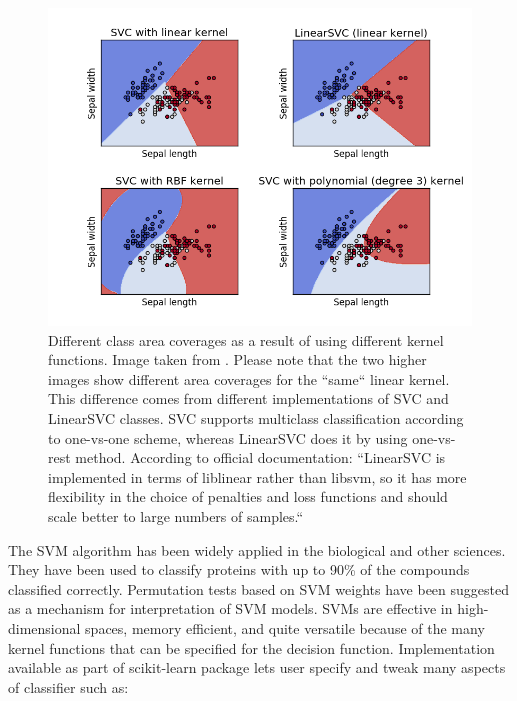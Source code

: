 \begin{figure}[htp]
	\centering
	\includegraphics[width=1.0\textwidth]{Figures/svm_kernel_functions.png}
	\caption{Different class area coverages as a result of using different kernel functions. Image taken from \cite{Scikit-Learn_Website}. Please note that the two higher images show different area coverages for the ``same`` linear kernel. This difference comes from different implementations of SVC and LinearSVC classes. SVC supports multiclass classification according to one-vs-one scheme, whereas LinearSVC does it by using one-vs-rest method. According to official documentation: ``LinearSVC is implemented in terms of liblinear rather than libsvm, so it has more flexibility in the choice of penalties and loss functions and should scale better to large numbers of samples.``\cite{Scikit-Learn_Website}}
	\label{fig:svm_kernel_functions}\vspace{-3pt}
\end{figure}

The SVM algorithm has been widely applied in the biological and other sciences. They have been used to classify proteins with up to 90\% of the compounds classified correctly. Permutation tests based on SVM weights have been suggested as a mechanism for interpretation of SVM models\cite{SVMMedical1}\cite{SVMMedical2}. SVMs are effective in high-dimensional spaces, memory efficient, and quite versatile because of the many kernel functions that can be specified for the decision function. Implementation available as part of scikit-learn package lets user specify and tweak many aspects of classifier such as:

